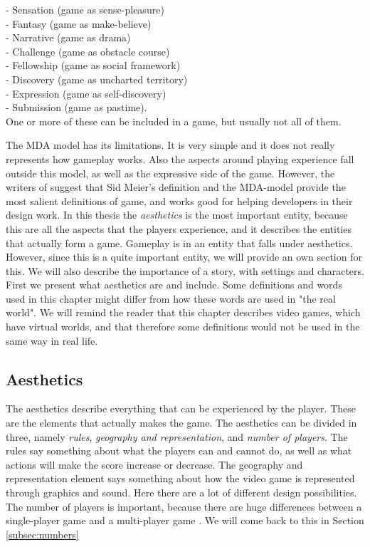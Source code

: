 - Sensation (game as sense-pleasure)\\
- Fantasy (game as make-believe)\\
- Narrative (game as drama)\\
- Challenge (game as obstacle course)\\
- Fellowship (game as social framework)\\
- Discovery (game as uncharted territory)\\
- Expression (game as self-discovery)\\
- Submission (game as pastime).\\
One or more of these can be included in a game, but usually not all of them.

The MDA model has its limitations. It is very simple and it does not really represents how gameplay works. Also the aspects around playing experience fall outside this model, as well as the expressive side of the game. However, the writers of \cite{understandingvg} suggest that Sid Meier's definition and the MDA-model provide the most salient definitions of game, and works good for helping developers in their design work. In this thesis the \emph{aesthetics} is the most important entity, because this are all the aspects that the players experience, and it describes the entities that actually form a game. Gameplay is in \cite{understandingvg} an entity that falls under aesthetics. However, since this is a quite important entity, we will provide an own section for this. We will also describe the importance of a story, with settings and characters. First we present what aesthetics are and include. Some definitions and words used in this chapter might differ from how these words are used in "the real world". We will remind the reader that this chapter describes video games, which have virtual worlds, and that therefore some definitions would not be used in the same way in real life.    


\subsection{Aesthetics}
The aesthetics describe everything that can be experienced by the player. These are the elements that actually makes the game. The aesthetics can be divided in three, namely \emph{rules}, \emph{geography and representation}, and \emph{number of players}. The rules say something about what the players can and cannot do, as well as what actions will make the score increase or decrease. The geography and representation element says something about how the video game is represented through graphics and sound. Here there are a lot of different design possibilities. The number of players is important, because there are huge differences between a single-player game and a multi-player game \cite{understandingvg}. We will come back to this in Section \ref{subsec:numbers}


